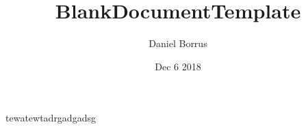 \documentclass[12pt,letterpaper]{standalone}	%
\title{BlankDocumentTemplate}
\date{Dec 6 2018}
\author{Daniel Borrus}
\begin{document}
tewatewtadrgadgadsg
\end{document}
